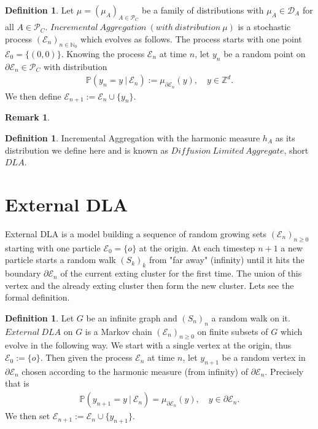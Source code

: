 \documentclass[12pt,a4paper]{scrartcl}
\numberwithin{equation}{section}
\numberwithin{equation}{section}%
\theoremstyle{definition}
\newtheorem{definition}[theorem]{Definition}
\theoremstyle{definition}
\newtheorem{rem}[thm]{Remark}%
\begin{document}
\begin{definition}
	Let $\mu=(\mu_A)_{A\in \mathcal{P}_C}$ be a family of distributions with $\mu_A\in \mathcal{D}_A$ for all $A\in \mathcal{P}_C$. $\mathit{Incremental\ Aggregation\ (with\ distribution\ \mu)}$ is a stochastic process $(\mathcal{E}_n)_{n\in{\mathbb{N}_0}}$ which evolves as follows. The process starts with one point $\mathcal{E}_0 = \{(0,0)\}$. Knowing the process $\mathcal{E}_n$ at time $n$, let $y_n$ be a random point on $\partial \mathcal{E}_n\in \mathcal{P}_C$ with distribution
	\begin{align}
		\mathbb{P}(y_n = y\ |\ \mathcal{E}_n) := \mu_{\partial \mathcal{E}_n}(y),\quad y\in \mathbb{Z}^d.
	\end{align}
	We then define $\mathcal{E}_{n+1} := \mathcal{E}_n \cup \{y_n\}$.
\end{definition} 

\begin{rem}
	
\end{rem}

\begin{definition}
	Incremental Aggregation with the harmonic measure $h_A$ as its distribution we define here and is known as $\mathit{Diffusion\ Limited\ Aggregate}$, short $\mathit{DLA}$.
\end{definition}

\newpage

\newpage
\section{External DLA}

External DLA is a model building a sequence of random growing sets $(\mathcal{E}_n)_{n\geq 0}$ starting with one particle $\mathcal{E}_0=\{o\}$ at the origin. At each timestep $n+1$ a new particle starts a random walk $(S_k)_k$ from "far away" (infinity) until it hits the boundary $\partial \mathcal{E}_n$ of the current exting cluster for the first time. The union of this vertex and the already exting cluster then form the new cluster. Lets see the formal definition.

\begin{definition}
	Let $G$ be an infinite graph and $(S_n)_n$ a random walk on it. $External\ DLA$ on $G$ is a Markov chain $(\mathcal{E}_n)_{n\geq 0}$ on finite subsets of $G$ which evolve in the following way. We start with a single vertex at the origin, thus $\mathcal{E}_0 := \{o\}$. Then given the process $\mathcal{E}_n$ at time $n$, let $y_{n+1}$ be a random vertex in $\partial \mathcal{E}_n$ chosen according to the harmonic measure (from infinity) of $\partial \mathcal{E}_n$. Precisely that is
	\begin{align*}
		\mathbb{P}(y_{n+1}=y\ |\ \mathcal{E}_n) = \mu_{\partial \mathcal{E}_n}(y),\quad y\in \partial \mathcal{E}_n.
	\end{align*}
	We then set $\mathcal{E}_{n+1} := \mathcal{E}_n \cup \{y_{n+1}\}$.	
	
\end{definition}
\end{document}
